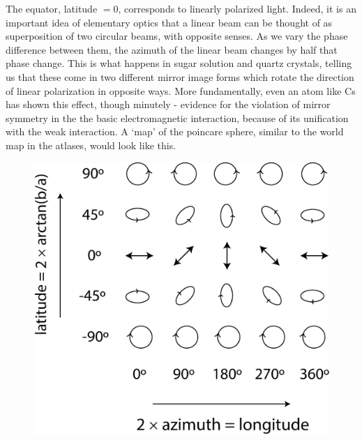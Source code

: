 The equator, latitude $= 0$, corresponds to linearly polarized light. Indeed,
it is an important idea of elementary optics that a linear beam can be thought
of as superposition of two circular beams, with opposite senses. As we vary the
phase difference between them, the azimuth of the linear beam changes by half
that phase change. This is what happens in sugar solution and quartz crystals,
telling us that these come in two different mirror image forms which rotate the
direction of linear polarization in opposite ways. More fundamentally, even an
atom like Cs has shown this effect, though minutely - evidence for the violation
of mirror symmetry in the the basic electromagnetic interaction, because of its
unification with the weak interaction. A `map' of the poincare sphere, similar
to the world map in the atlases, would look like this.
\begin{figure}[H]
\centering
\includegraphics[scale=0.2]{src/images/chap26/6.eps}
\end{figure}

